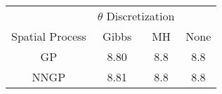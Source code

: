 
\begin{tabular}{cccc}
\toprule
\multicolumn{1}{c}{ } & \multicolumn{2}{c}{$\theta$ Discretization} \\
\cmidrule(l{3pt}r{3pt}){2-3}
Spatial Process & Gibbs & MH & None\\
\midrule
GP & 8.80 & 8.8 & 8.8\\
NNGP & 8.81 & 8.8 & 8.8\\
\bottomrule
\end{tabular}
